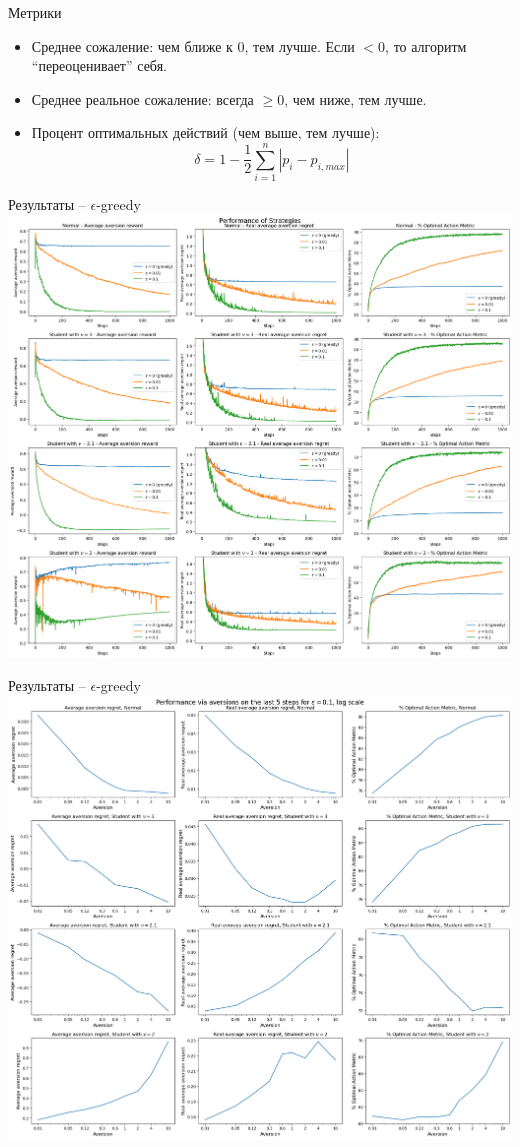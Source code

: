 \documentclass[10pt]{beamer} %
\begin{document}
\begin{frame}{Метрики}
    \begin{itemize}
        \item <1-> Среднее сожаление: чем ближе к 0, тем лучше. Если $< 0$, то алгоритм ``переоценивает'' себя.
        \item <2-> Среднее реальное сожаление: всегда $\geq 0$, чем ниже, тем лучше.
        \item <3-> Процент оптимальных действий (чем выше, тем лучше): $$\delta = 1 - \frac{1}{2}\sum_{i=1}^n |p_i - p_{i, max}|$$
    \end{itemize}
\end{frame}
\begin{frame}{Результаты -- $\epsilon$-greedy}
    \includegraphics[scale=0.17,center]{images/experiments_aversion/eps_greedy/compare_strategies_inner.png}
\end{frame}
\begin{frame}{Результаты -- $\epsilon$-greedy}
    \includegraphics[scale=0.17,center]{images/experiments_aversion/eps_greedy/last_5_steps_outer.png}
\end{frame}
\end{document}
